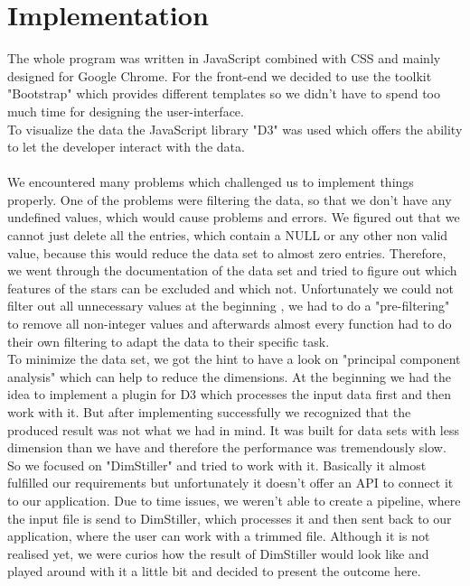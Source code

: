 \documentclass{vgtc}                          %
\begin{document}
\section{Implementation}
The whole program was written in JavaScript combined with CSS and mainly designed for Google Chrome. For the front-end we decided to use the toolkit "Bootstrap"\cite{bootstrap} which provides different templates so we didn't have to spend too much time for designing the user-interface.\\
To visualize the data the JavaScript library "D3"\cite{d3} was used which offers the ability to let the developer interact with the data.\\
\\
We encountered many problems which challenged us to implement things properly. One of the problems were filtering the data, so that we don't have any undefined values, which would cause problems and errors. We figured out that we cannot just delete all the entries, which contain a NULL or any other non valid value, because this would reduce the data set to almost zero entries. Therefore, we went through the documentation of the data set and tried to figure out which features of the stars can be excluded and which not. Unfortunately we could not filter out all unnecessary values at the beginning , we had to do a "pre-filtering" to remove all non-integer values and afterwards almost every function had to do their own filtering to adapt the data to their specific task.\\
To minimize the data set, we got the hint to have a look on "principal component analysis" which can help to reduce the dimensions. At the beginning we had the idea to implement a plugin\cite{pca} for D3 which processes the input data first and then work with it. But after implementing successfully we recognized that the produced result was not what we had in mind. It was built for data sets with less dimension than we have and therefore the performance was tremendously slow. So we focused on "DimStiller"\cite{dimstiller} and tried to work with it. Basically it almost fulfilled our requirements but unfortunately it doesn't offer an API to connect it to our application. Due to time issues, we weren't able to create a pipeline, where the input file is send to DimStiller, which processes it and then sent back to our application, where the user can work with a trimmed file. Although it is not realised yet, we were curios how the result of DimStiller would look like and played around with it a little bit and decided to present the outcome here.\\
\end{document}
